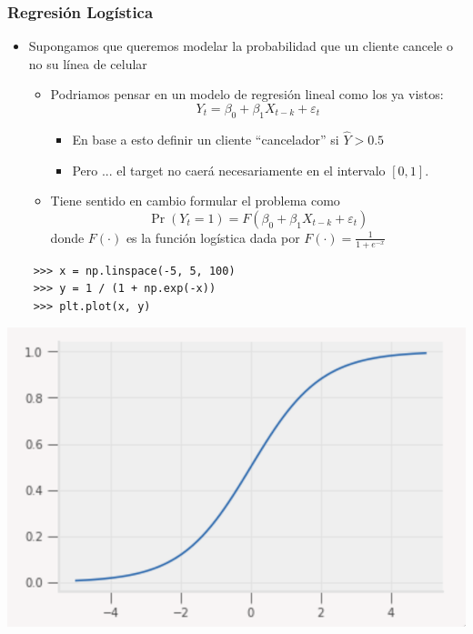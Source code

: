 \documentclass[leqno, 10pt, envcountsect]{beamer}
\numberwithin{equation}{section}
\theoremstyle{definition}
\theoremstyle{example}
\numberwithin{figure}{section}
\numberwithin{table}{section}
\let\olditem\item
\renewcommand{\item}{%
\olditem\vspace{1pt}}
\begin{document}
\begin{frame}[fragile=singleslide]
  \frametitle{Regresión Logística}
  \begin{itemize}
    \item Supongamos que queremos modelar la probabilidad que un cliente cancele
      o no su línea de celular
    \begin{itemize}
      \item Podriamos pensar en un modelo de regresión lineal como los ya
        vistos:
        \begin{equation*}
          Y_{t} = \beta_{0} + \beta_{1}X_{t-k} + \varepsilon_{t}
        \end{equation*}
        \begin{itemize}
          \item En base a esto definir un cliente \enquote{cancelador} si $\hat{Y} > 0.5$
          \item Pero ... el target no caerá necesariamente en el intervalo $[0,1]$.
        \end{itemize}
      \item Tiene sentido en cambio formular el problema como
      \begin{equation*}
        \Pr(Y_{t} = 1) = F(\beta_{0} + \beta_{1}X_{t-k} + \varepsilon_{t})
      \end{equation*}
      donde $F(\cdot)$ es la función logística dada por $F(\cdot) = \frac{1}{1 + e^{-x}}$
    \end{itemize}
  \end{itemize}
    \begin{verbatim}
    >>> x = np.linspace(-5, 5, 100)
    >>> y = 1 / (1 + np.exp(-x))
    >>> plt.plot(x, y)
    \end{verbatim}
    \begin{center}
      \includegraphics[scale=0.15]{logistic.png}
    \end{center}
\end{frame}
\end{document}

